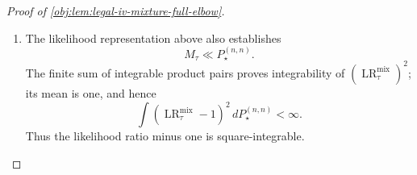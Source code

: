 \begin{proof}[Proof of \cref{obj:lem:legal-iv-mixture-full-elbow}]
\begin{enumerate}
For each fixed \(\lambda\), the products \(\lambda_{\ell}\lambda'_{\ell}\) are independent uniform signs. Factoring their exponential moment and using the standard inequality
\[
\cosh(t)\le e^{t^2/2},\qquad t\in\mathbb R,
\]
gives
\[
\begin{aligned}
\mathbb E_{\lambda'}
\exp\left\{
\frac{nh^2\{\gamma(b,\tau)+1\}}
{2K_{\mathrm L}}\mathscr O(\lambda,\lambda')
\right\}
&=
\cosh\left(
\frac{nh^2\{\gamma(b,\tau)+1\}}{2K_{\mathrm L}}
\right)^{K_{\mathrm L}}\\
&\le
\exp\left\{
\frac{n^2h^4\{\gamma(b,\tau)+1\}^2}
{8K_{\mathrm L}}
\right\}.
\end{aligned}
\]
Averaging over \(\lambda\) preserves this bound. Finally,
\[
n^2\le K_{\mathrm L}^{3/2},
\qquad
h^4=c_{\star}^4K_{\mathrm L}^{-1/2},
\]
so
\[
\frac{n^2h^4\{\gamma(b,\tau)+1\}^2}{8K_{\mathrm L}}
=
\frac{n^2}{K_{\mathrm L}^{3/2}}
\frac{\{\gamma(b,\tau)+1\}^2}{8}c_{\star}^4
\le
\frac{(139/15)^2}{8}c_{\star}^4
=
\frac{19321}{1800}c_{\star}^4.
\]
This proves
\[
1+\chi^2(M_{\tau},P_{\star}^{(n,n)})
\le\exp\{C_{\mathrm{mix}}c_{\star}^4\}.
\]

With the distance normalization in \cref{obj:synth_17}, absolute continuity and Cauchy--Schwarz yield
\[
\begin{aligned}
\operatorname{TV}(M_{\tau},P_{\star}^{(n,n)})
&=
\frac12\int
\left|\operatorname{LR}_{\tau}^{\mathrm{mix}}-1\right|
\,dP_{\star}^{(n,n)}\\
&\le
\frac12\left\{
\int
\left(\operatorname{LR}_{\tau}^{\mathrm{mix}}-1\right)^2
\,dP_{\star}^{(n,n)}
\right\}^{1/2}\\
&=\frac12\sqrt{\chi^2(M_{\tau},P_{\star}^{(n,n)})}.
\end{aligned}
\]
The amplitude calibration therefore gives
\[
\chi^2(M_{\tau},P_{\star}^{(n,n)})
\le\exp\{C_{\mathrm{mix}}c_{\star}^4\}-1
\le(1-\alpha)^2,
\]
and, because \(1-\alpha>0\),
\[
\operatorname{TV}(M_{\tau},P_{\star}^{(n,n)})
\le\frac{1-\alpha}{2}.
\]
Every estimate is uniform over \(\tau\in[-1,1]\).

\item
The likelihood representation above also establishes
\[
M_{\tau}\ll P_{\star}^{(n,n)}.
\]
The finite sum of integrable product pairs proves integrability of
\((\operatorname{LR}_{\tau}^{\mathrm{mix}})^2\); its mean is one, and hence
\[
\int
\left(\operatorname{LR}_{\tau}^{\mathrm{mix}}-1\right)^2
\,dP_{\star}^{(n,n)}
<\infty.
\]
Thus the likelihood ratio minus one is square-integrable.


\end{enumerate}
\end{proof}
